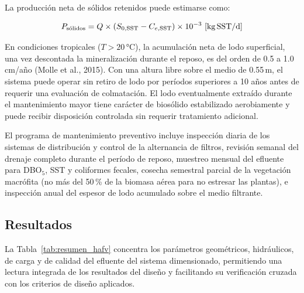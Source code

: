 \documentclass[12pt,a4paper]{article}
\newcommand{\captionequation}[1]{}
\begin{document}
La producción neta de sólidos retenidos puede estimarse como:

\begin{equation}
P_\text{sólidos} = Q \times (S_{0,\text{SST}} - C_{e,\text{SST}}) \times 10^{-3}\ \text{[kg\,SST/d]}
\end{equation}
\captionequation{Producción de sólidos retenidos en el medio filtrante del HAFV}

En condiciones tropicales ($T > 20$\,°C), la acumulación neta de lodo superficial, una vez descontada la mineralización durante el reposo, es del orden de 0.5 a 1.0\,cm/año (Molle et al., 2015). Con una altura libre sobre el medio de 0.55\,m, el sistema puede operar sin retiro de lodo por períodos superiores a 10 años antes de requerir una evaluación de colmatación. El lodo eventualmente extraído durante el mantenimiento mayor tiene carácter de biosólido estabilizado aerobiamente y puede recibir disposición controlada sin requerir tratamiento adicional.

El programa de mantenimiento preventivo incluye inspección diaria de los sistemas de distribución y control de la alternancia de filtros, revisión semanal del drenaje completo durante el período de reposo, muestreo mensual del efluente para DBO$_5$, SST y coliformes fecales, cosecha semestral parcial de la vegetación macrófita (no más del 50\,\% de la biomasa aérea para no estresar las plantas), e inspección anual del espesor de lodo acumulado sobre el medio filtrante.


\subsection{Resultados}

La Tabla~\ref{tab:resumen_hafv} concentra los parámetros geométricos, hidráulicos, de carga y de calidad del efluente del sistema dimensionado, permitiendo una lectura integrada de los resultados del diseño y facilitando su verificación cruzada con los criterios de diseño aplicados.
\end{document}
